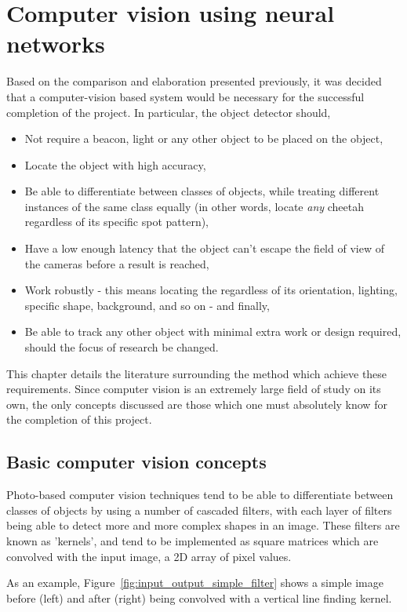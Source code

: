 \section{Computer vision using neural networks}

Based on the comparison and elaboration presented previously, it was decided that a computer-vision based system would be necessary for the successful completion of the project. In particular, the object detector should,

\begin{itemize}
	\item Not require a beacon, light or any other object to be placed on the object,
	\item Locate the object with high accuracy,
	\item Be able to differentiate between classes of objects, while treating different instances of the same class equally (in other words, locate \emph{any} cheetah regardless of its specific spot pattern),
	\item Have a low enough latency that the object can't escape the field of view of the cameras before a result is reached,
	\item Work robustly - this means locating the regardless of its orientation, lighting, specific shape, background, and so on - and finally,
	\item Be able to track any other object with minimal extra work or design required, should the focus of research be changed.
\end{itemize}

This chapter details the literature surrounding the method which achieve these requirements. Since computer vision is an extremely large field of study on its own, the only concepts discussed are those which one must absolutely know for the completion of this project.

\subsection{Basic computer vision concepts}
Photo-based computer vision techniques tend to be able to differentiate between classes of objects by using a number of cascaded filters, with each layer of filters being able to detect more and more complex shapes in an image. These filters are known as 'kernels', and tend to be implemented as square matrices which are convolved with the input image, a 2D array of pixel values.

As an example, Figure~\ref{fig:input_output_simple_filter} shows a simple image before (left) and after (right) being convolved with a vertical line finding kernel.

